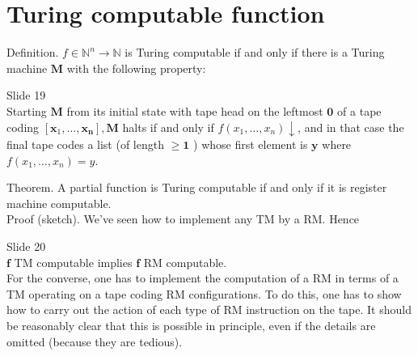 \documentclass[10pt]{article}
\begin{document}



\section*{Turing computable function}
Definition. $f \in \mathbb{N}^{n} \rightarrow \mathbb{N}$ is Turing computable if and only if there is a Turing machine $\boldsymbol{M}$ with the following property:

Slide 19\\
Starting $\boldsymbol{M}$ from its initial state with tape head on the leftmost $\mathbf{0}$ of a tape coding $\left[\boldsymbol{x}_{1}, \ldots, \boldsymbol{x}_{\boldsymbol{n}}\right], \boldsymbol{M}$ halts if and only if $f\left(x_{1}, \ldots, x_{n}\right) \downarrow$, and in that case the final tape codes a list (of length $\geq \mathbf{1}$ ) whose first element is $\boldsymbol{y}$ where $f\left(x_{1}, \ldots, x_{n}\right)=y$.

Theorem. A partial function is Turing computable if and only if it is register machine computable.\\
Proof (sketch). We've seen how to implement any TM by a RM. Hence

Slide 20\\
$\boldsymbol{f}$ TM computable implies $\boldsymbol{f}$ RM computable.\\
For the converse, one has to implement the computation of a RM in terms of a TM operating on a tape coding RM configurations. To do this, one has to show how to carry out the action of each type of RM instruction on the tape. It should be reasonably clear that this is possible in principle, even if the details are omitted (because they are tedious).
\end{document}
